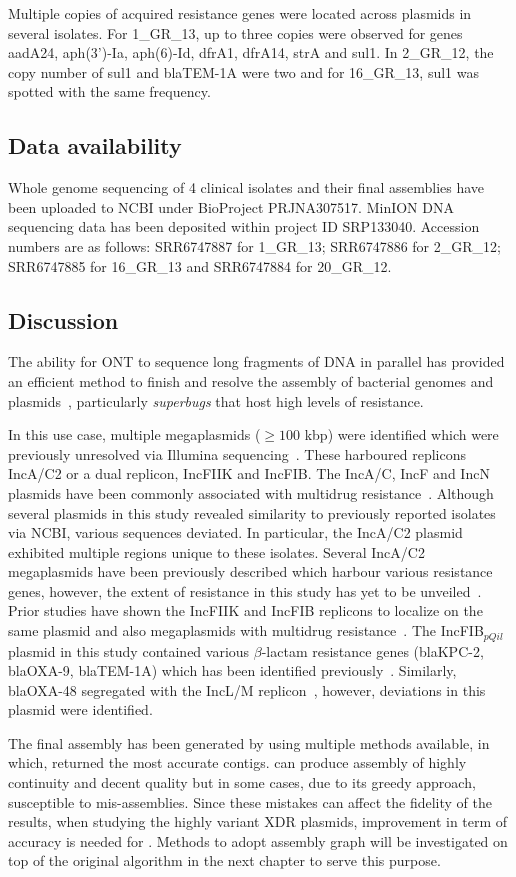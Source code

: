 Multiple copies of acquired resistance genes were located across plasmids in several isolates. For 1\_GR\_13, up to three copies were observed for genes aadA24, aph(3')-Ia, aph(6)-Id, dfrA1, dfrA14, strA and sul1. In 2\_GR\_12, the copy number of sul1 and blaTEM-1A were two and for 16\_GR\_13, sul1 was spotted with the same frequency.

\subsection{Data availability}
Whole genome sequencing of 4 clinical isolates and their final assemblies have been uploaded to NCBI under BioProject PRJNA307517.
MinION DNA sequencing data has been deposited within project ID SRP133040. 
Accession numbers are as follows: SRR6747887 for 1\_GR\_13; SRR6747886 for 2\_GR\_12; SRR6747885 for 16\_GR\_13 and SRR6747884 for 20\_GR\_12.

\subsection{Discussion}
The ability for ONT to sequence long fragments of DNA in parallel has provided an efficient method to finish  and resolve the assembly of bacterial genomes and plasmids~\cite{Cao2017scaffolding,Wick2017M12}, particularly \emph{superbugs} that host high levels of resistance. 

In this use case, multiple megaplasmids ($\geq 100$ kbp) were identified which were previously unresolved via Illumina sequencing~\cite{Miranda2018}. These harboured replicons IncA/C2 or a dual replicon, IncFIIK and IncFIB. 
The IncA/C, IncF and IncN plasmids have been commonly associated with multidrug resistance~\cite{Carattoli2009M34}. 
Although several plasmids in this study revealed similarity to previously reported isolates via NCBI, various sequences deviated. 
In particular, the IncA/C2 plasmid exhibited multiple regions unique to these isolates. 
Several IncA/C2 megaplasmids have been previously described which harbour various resistance genes, however, the extent of resistance in this study has yet to be unveiled~\cite{Desmet2018M35,Papagiannitsis2016cM36}. 
Prior studies have shown the IncFIIK and IncFIB replicons to localize on the same plasmid and also megaplasmids with multidrug resistance~\cite{Navon2017M6}. 
The IncFIB$_{pQil}$ plasmid in this study contained various $\beta$-lactam resistance genes (blaKPC-2, blaOXA-9, blaTEM-1A) which has been identified previously~\cite{Chen2014M37}. Similarly, blaOXA-48 segregated with the IncL/M replicon~\cite{Poirel2012M38,Potron2014M39}, however, deviations in this plasmid were identified.

The final assembly has been generated by using multiple methods available, in which, \unicycler{} returned the most accurate contigs. \npscarf{} can produce assembly of highly continuity and decent quality but in some cases, due to its greedy approach, susceptible to mis-assemblies. Since  these mistakes can affect the fidelity of the results, \EG{} when studying the highly variant XDR plasmids, improvement in term of accuracy is needed for \npscarf{}. Methods to adopt assembly graph will be investigated on top of the original algorithm in the next chapter to serve this purpose. 
